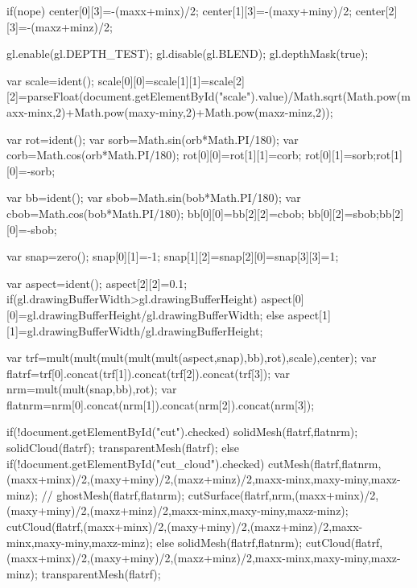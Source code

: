 {                if(nope){
                    center[0][3]=-(maxx+minx)/2;
                    center[1][3]=-(maxy+miny)/2;
                    center[2][3]=-(maxz+minz)/2;
                }

                gl.enable(gl.DEPTH_TEST);
                gl.disable(gl.BLEND);
                gl.depthMask(true);
                
                var scale=ident();
                scale[0][0]=scale[1][1]=scale[2][2]=parseFloat(document.getElementById("scale").value)/Math.sqrt(Math.pow(maxx-minx,2)+Math.pow(maxy-miny,2)+Math.pow(maxz-minz,2));

                var rot=ident();
                var sorb=Math.sin(orb*Math.PI/180);
                var corb=Math.cos(orb*Math.PI/180);
                rot[0][0]=rot[1][1]=corb;
                rot[0][1]=sorb;rot[1][0]=-sorb;
                
                var bb=ident();
                var sbob=Math.sin(bob*Math.PI/180);
                var cbob=Math.cos(bob*Math.PI/180);
                bb[0][0]=bb[2][2]=cbob;
                bb[0][2]=sbob;bb[2][0]=-sbob;
                
                var snap=zero();
                snap[0][1]=-1;
                snap[1][2]=snap[2][0]=snap[3][3]=1;
                
                var aspect=ident();
                aspect[2][2]=0.1;
                if(gl.drawingBufferWidth>gl.drawingBufferHeight){
                    aspect[0][0]=gl.drawingBufferHeight/gl.drawingBufferWidth;
                }else{
                    aspect[1][1]=gl.drawingBufferWidth/gl.drawingBufferHeight;
                }
                
                var trf=mult(mult(mult(mult(mult(aspect,snap),bb),rot),scale),center);
                var flatrf=trf[0].concat(trf[1]).concat(trf[2]).concat(trf[3]);
                var nrm=mult(mult(snap,bb),rot);
                var flatnrm=nrm[0].concat(nrm[1]).concat(nrm[2]).concat(nrm[3]);

                if(!document.getElementById("cut").checked){
                    solidMesh(flatrf,flatnrm);
                    solidCloud(flatrf);
                    transparentMesh(flatrf);
                }else{
                    if(!document.getElementById("cut_cloud").checked){
                        cutMesh(flatrf,flatnrm,(maxx+minx)/2,(maxy+miny)/2,(maxz+minz)/2,maxx-minx,maxy-miny,maxz-minz);
//                        ghostMesh(flatrf,flatnrm);
                        cutSurface(flatrf,nrm,(maxx+minx)/2,(maxy+miny)/2,(maxz+minz)/2,maxx-minx,maxy-miny,maxz-minz);
                        cutCloud(flatrf,(maxx+minx)/2,(maxy+miny)/2,(maxz+minz)/2,maxx-minx,maxy-miny,maxz-minz);
                    } else {
                        solidMesh(flatrf,flatnrm);
                        cutCloud(flatrf,(maxx+minx)/2,(maxy+miny)/2,(maxz+minz)/2,maxx-minx,maxy-miny,maxz-minz);
                        transparentMesh(flatrf);
                    }
                }
            }
            
